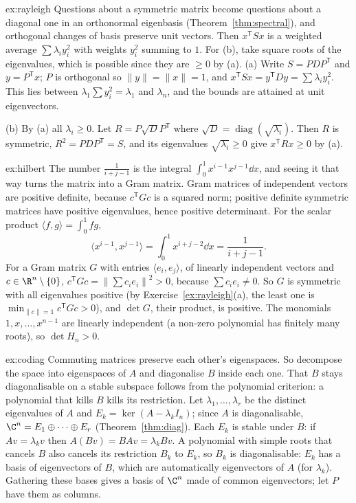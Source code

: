 \begin{solution}{ex:rayleigh}
\idea Questions about a symmetric matrix become questions about a diagonal one in an orthonormal eigenbasis (Theorem~\ref{thm:spectral}), and orthogonal changes of basis preserve unit vectors. Then $x^{\mathsf T}Sx$ is a weighted average $\sum\lambda_iy_i^2$ with weights $y_i^2$ summing to $1$. For (b), take square roots of the eigenvalues, which is possible since they are $\ge0$ by (a).
\writeup (a) Write $S=PDP^{\mathsf T}$ and $y=P^{\mathsf T}x$; $P$ is orthogonal so $\|y\|=\|x\|=1$, and $x^{\mathsf T}Sx=y^{\mathsf T}Dy=\sum\lambda_iy_i^2$. This lies between $\lambda_1\sum y_i^2=\lambda_1$
and $\lambda_n$, and the bounds are attained at unit eigenvectors.

(b) By (a) all $\lambda_i\ge0$. Let $R=P\sqrt DP^{\mathsf T}$ where $\sqrt D=\operatorname{diag}(\sqrt{\lambda_i})$. Then $R$ is symmetric, $R^2=PDP^{\mathsf T}=S$, and its eigenvalues
$\sqrt{\lambda_i}\ge0$ give $x^{\mathsf T}Rx\ge0$ by (a).
\end{solution}

\begin{solution}{ex:hilbert}
\idea The number $\frac1{i+j-1}$ is the integral $\int_0^1x^{i-1}x^{j-1}\dd x$, and seeing it that way turns the matrix into a Gram matrix. Gram matrices of independent vectors are positive definite, because $c^{\mathsf T}Gc$ is a squared norm; positive definite symmetric matrices have positive eigenvalues, hence positive determinant.
\writeup For the scalar product $\langle f,g\rangle=\int_0^1fg$,
\[
\langle x^{i-1},x^{j-1}\rangle=\int_0^1x^{i+j-2}\dd x=\frac1{i+j-1}.
\]
For a Gram matrix $G$ with entries $\langle e_i,e_j\rangle$, of linearly independent vectors and $c\in\R^n\setminus\{0\}$,
$c^{\mathsf T}Gc=\left\|\sum c_ie_i\right\|^2>0$, because $\sum c_ie_i\ne0$. So $G$ is symmetric with all eigenvalues positive (by Exercise~\ref{ex:rayleigh}(a), the least one is $\min_{\|c\|=1}c^{\mathsf T}Gc>0$), and $\det G$, their product, is positive.
The monomials $1,x,\dots,x^{n-1}$ are linearly independent (a non-zero polynomial has finitely many roots), so $\det H_n>0$.
\end{solution}

\begin{solution}{ex:codiag}
\idea Commuting matrices preserve each other's eigenspaces. So decompose the space into eigenspaces of $A$ and diagonalise $B$ inside each one. That $B$ stays diagonalisable on a stable subspace follows from the polynomial criterion: a polynomial that kills $B$ kills its restriction.
\writeup Let $\lambda_1,\dots,\lambda_r$ be the distinct eigenvalues of $A$ and $E_k=\ker(A-\lambda_kI_n)$; since $A$ is diagonalisable, $\C^n=E_1\oplus\dots\oplus E_r$ (Theorem~\ref{thm:diag}).
Each $E_k$ is stable under $B$: if $Av=\lambda_kv$ then $A(Bv)=BAv=\lambda_kBv$. A polynomial with simple roots that cancels $B$ also cancels its restriction $B_k$ to $E_k$,
so $B_k$ is diagonalisable: $E_k$ has a basis of eigenvectors of $B$, which are automatically eigenvectors of $A$ (for $\lambda_k$). Gathering these bases gives a basis of $\C^n$ made of common eigenvectors; let $P$ have them as columns.
\end{solution}


